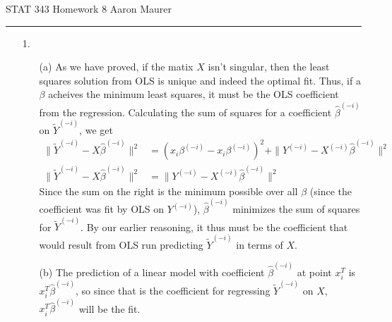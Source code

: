 \documentclass[11pt]{article}
\theoremstyle{definition}
\begin{document}

STAT 343 Homework 8 \hfill Aaron Maurer
\vspace{2mm}
\hrule
\vspace{2mm}

\begin{itemize}
    \item[1.]
        \begin{itemize}
            \item[(a)]
                As we have proved, if the matix $X$ isn't singular, then the least squares solution from OLS is unique and indeed the optimal fit. Thus, if a $\beta$ acheives the minimum least squares, it must be the OLS coefficient from the regression. Calculating the sum of squares for a coefficient $\hat\beta ^{(-i)}$ on $\tilde Y^{(-i)}$, we get 
                \begin{align*}
                    \|\tilde Y^{(-i)} - X\hat\beta^{(-i)}\|^2 &= (x_i\beta^{(-i)} - x_i\beta^{(-i)})^2 + \|Y^{(-i)} - X^{(-i)}\hat\beta ^{(-i)}\|^2 \\
                    \|\tilde Y^{(-i)} - X\hat\beta^{(-i)}\|^2 &= \|Y^{(-i)} - X^{(-i)}\hat\beta^{(-i)}\|^2
                \end{align*}
                Since the sum on the right is the minimum possible over all $\beta$ (since the coefficient was fit by OLS on $Y^{(-i)}$), $\hat\beta ^{(-i)}$ minimizes the sum of squares for $\tilde Y^{(-i)}$. By our earlier reasoning, it thus must be the coefficient that would result from OLS run predicting $\tilde Y^{(-i)}$ in terms of $X$. 
            \item[(b)]
                The prediction of a linear model with coefficient $\hat\beta ^{(-i)}$ at point $x_i^T$ is $x_i^T\hat\beta ^{(-i)}$, so since that is the coefficient for regressing $\tilde Y^{(-i)}$ on $X$, $x_i^T\hat\beta ^{(-i)}$ will be the fit.


\end{itemize}
\end{itemize}
\end{document}
